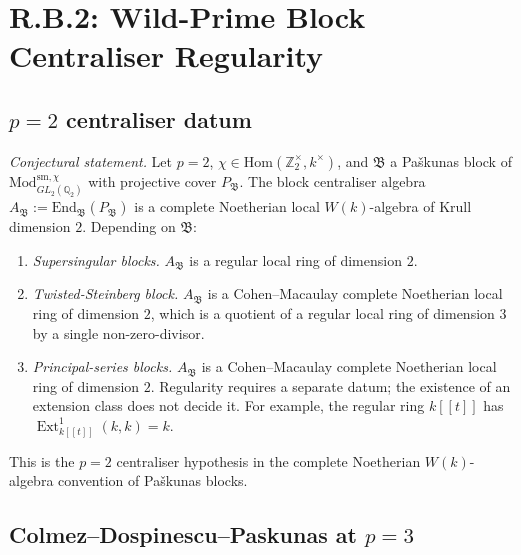 \section{R.B.2: Wild-Prime Block Centraliser Regularity}
\label{v4-arith:w6-f:R-B-2}

\subsection{\(p=2\) centraliser datum}

\begin{hypothesis}[\(p=2\) wild block-centraliser datum]
\label{v4-arith:w6-f:thm:PaskunasTung-p2}
\emph{Conjectural statement.} Let \(p=2\), \(\chi\in\mathrm{Hom}(\mathbb{Z}_{2}^{\times},k^{\times})\),
and \(\mathfrak{B}\) a Pa\v skunas block of
\(\mathrm{Mod}^{\mathrm{sm},\chi}_{GL_{2}(\mathbb{Q}_{2})}\) with projective
cover \(P_{\mathfrak{B}}\). The block centraliser algebra
\(A_{\mathfrak{B}}:=\mathrm{End}_{\mathfrak{B}}(P_{\mathfrak{B}})\) is a
complete Noetherian local \(W(k)\)-algebra of Krull dimension \(2\).
Depending on \(\mathfrak{B}\):
\begin{enumerate}
\item \emph{Supersingular blocks.} \(A_{\mathfrak{B}}\) is a regular
local ring of dimension \(2\).
\item \emph{Twisted-Steinberg block.} \(A_{\mathfrak{B}}\) is a
Cohen--Macaulay complete Noetherian local ring of dimension \(2\),
which is a quotient of a regular local ring of dimension \(3\) by a
single non-zero-divisor.
\item \emph{Principal-series blocks.} \(A_{\mathfrak{B}}\) is a
Cohen--Macaulay complete Noetherian local ring of dimension \(2\).
Regularity requires a separate datum; the existence of an extension
class does not decide it. For example, the regular ring \(k[[t]]\)
has \(\operatorname{Ext}^1_{k[[t]]}(k,k)=k\).
\end{enumerate}
\end{hypothesis}

\begin{remark}
This is the \(p=2\) centraliser hypothesis in the complete Noetherian
\(W(k)\)-algebra convention of Pa\v skunas blocks.
\end{remark}

\subsection{Colmez--Dospinescu--Paskunas at \(p=3\)}

